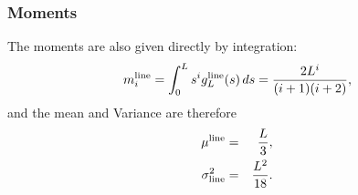 \subsubsection{Moments}

The moments are also given directly by integration:
\begin{equation}
   \label{eq:line_moments}
   m^{\rm line}_i = \int_0^L s^i g^{\rm line}_L(s) \, ds = \frac{2 L^{i}}{(i+1)(i+2)},
\end{equation}
and the mean and Variance are therefore
\begin{eqnarray}
  \mu^{\rm line} & = & \frac{L}{3},
  \label{eq:line_mean} \\
  \sigma^2_{\rm line}
      & = & \frac{L^{2}}{18}.
  \label{eq:line_var}
\end{eqnarray}



